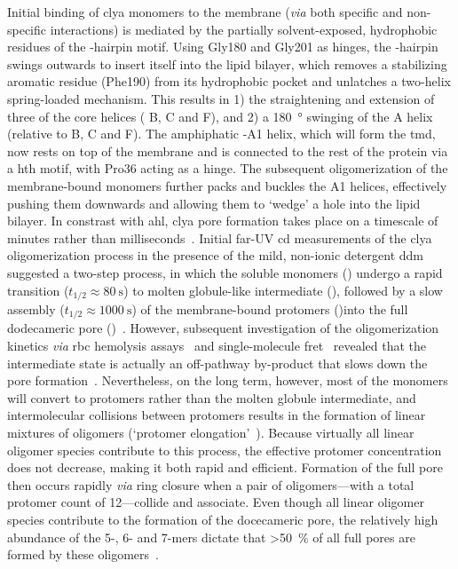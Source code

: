 Initial binding of \gls{clya} monomers to the membrane (\textit{via} both specific and non-specific
interactions) is mediated by the partially solvent-exposed, hydrophobic residues of the \tb-hairpin motif.
Using Gly180 and Gly201 as hinges, the \tb-hairpin swings outwards to insert itself into the lipid bilayer,
which removes a stabilizing aromatic residue (Phe190) from its hydrophobic pocket and unlatches a two-helix
spring-loaded mechanism. This results in 1) the straightening and extension of three of the core helices (\ta
B, \ta C and \ta F), and 2) a \SI{180}{\degree} swinging of the \ta A helix (relative to \ta B, \ta C and \ta
F). The amphiphatic \ta-A1 helix, which will form the \gls{tmd}, now rests on top of the membrane and is
connected to the rest of the protein via a \gls{hth} motif, with Pro36 acting as a hinge. The subsequent
oligomerization of the membrane-bound monomers further packs and buckles the \ta A1 helices, effectively
pushing them downwards and allowing them to `wedge' a hole into the lipid bilayer. In constrast with
\gls{ahl}, \gls{clya} pore formation takes place on a timescale of minutes rather than
milliseconds~\cite{Benke-2015}. Initial far-UV \gls{cd} measurements of the \gls{clya} oligomerization process
in the presence of the mild, non-ionic detergent \gls{ddm} suggested a two-step process, in which the soluble
monomers () undergo a rapid transition ($t_{1/2} \approx \SI{80}{\second}$) to molten globule-like
intermediate (), followed by a slow assembly  ($t_{1/2} \approx \SI{1000}{\second}$) of the
membrane-bound protomers ()into the full dodecameric pore ()~\cite{Eifler-2006}. However,
subsequent investigation of the oligomerization kinetics \textit{via} \gls{rbc} hemolysis
assays~\cite{Vaidyanathan-2014} and single-molecule \gls{fret}~\cite{Benke-2015} revealed that the
intermediate state is actually an off-pathway by-product that slows down the pore
formation~\cite{Roderer-2017}. Nevertheless, on the long term, however, most of the monomers will convert to
protomers rather than the molten globule intermediate, and intermolecular collisions between protomers results
in the formation of linear mixtures of oligomers (`protomer elongation'~\cite{Roderer-2017}). Because
virtually all linear oligomer species contribute to this process, the effective protomer concentration does
not decrease, making it both rapid and efficient. Formation of the full pore then occurs rapidly \textit{via}
ring closure when a pair of oligomers---with a total protomer count of 12---collide and associate. Even though
all linear oligomer species contribute to the formation of the docecameric pore, the relatively high abundance
of the 5-, 6- and 7-mers dictate that \SI{>50}{\percent} of all full pores are formed by these
oligomers~\cite{Benke-2015}.



